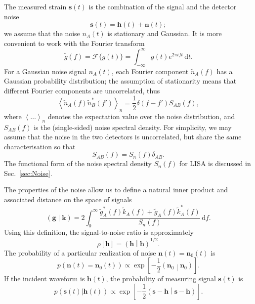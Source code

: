 \documentclass[useAMS,usedcolumn,usegraphicx,usenatbib]{mn2e}
\newcommand{\secref}[1]{Sec.~\ref{sec:#1}}
\newcommand{\dd}{\ensuremath{\mathrm{d}}}
\newcommand{\intd}[4]{\ensuremath{\int_{#1}^{#2}{#3}\,\dd{#4}}}
\newcommand{\recip}[1]{\ensuremath{\frac{1}{#1}}}
\newcommand{\innerprod}[2]{\ensuremath{\left({#1}\middle|{#2}\right)}}
\begin{document}
The measured strain $\boldsymbol{s}(t)$ is the combination of the signal and the detector noise
\begin{equation}
\boldsymbol{s}(t) = \boldsymbol{h}(t) + \boldsymbol{n}(t);
\end{equation}
we assume that the noise $n_A(t)$ is stationary and Gaussian. It is more convenient to work with the Fourier transform
\begin{equation}
\tilde{g}(f) = \mathscr{F}\{g(t)\} = \intd{-\infty}{\infty}{g(t)e^{2\pi i ft}}{t}.
\end{equation}
For a Gaussian noise signal $n_A(t)$, each Fourier component $\tilde{n}_A(f)$ has a Gaussian probability distribution; the assumption of stationarity means that different Fourier components are uncorrelated, thus \citep{Cutler1994}
\begin{equation}
\left\langle\tilde{n}_A(f)\tilde{n}_B^*(f')\right\rangle_n = \recip{2}\delta(f - f')S_{AB}(f),
\end{equation}
where $\left\langle\ldots\right\rangle_n$ denotes the expectation value over the noise distribution, and $S_{AB}(f)$ is the (single-sided) noise spectral density. For simplicity, we may assume that the noise in the two detectors is uncorrelated, but share the same characterisation so that \citep{Cutler1998}
\begin{equation}
S_{AB}(f) = S_n(f)\delta_{AB}.
\end{equation}
The functional form of the noise spectral density $S_n(f)$ for LISA is discussed in \secref{Noise}.

The properties of the noise allow us to define a natural inner product and associated distance on the space of signals \citep{Cutler1994}
\begin{equation}
\innerprod{\boldsymbol{g}}{\boldsymbol{k}} = 2\intd{0}{\infty}{\frac{\tilde{g}_A^\ast(f)\tilde{k}_A(f) + \tilde{g}_A(f)\tilde{k}_A^\ast(f)}{S_n(f)}}{f}.
\label{eq:inner}
\end{equation}
Using this definition, the signal-to-noise ratio is approximately
\begin{equation}
\rho[\boldsymbol{h}] = \innerprod{\boldsymbol{h}}{\boldsymbol{h}}^{1/2}.
\label{eq:SNR}
\end{equation}
The probability of a particular realization of noise $\boldsymbol{n}(t) = \boldsymbol{n}_0(t)$ is
\begin{equation}
p(\boldsymbol{n}(t) = \boldsymbol{n}_0(t)) \propto \exp\left[-\recip{2}\innerprod{\boldsymbol{n}_0}{\boldsymbol{n}_0}\right].
\end{equation}
If the incident waveform is $\boldsymbol{h}(t)$, the probability of measuring signal $\boldsymbol{s}(t)$ is
\begin{equation}
p(\boldsymbol{s}(t)|\boldsymbol{h}(t)) \propto \exp\left[-\recip{2}\innerprod{\boldsymbol{s}-\boldsymbol{h}}{\boldsymbol{s}-\boldsymbol{h}}\right].
\label{eq:sig_prob}
\end{equation}
\end{document}
